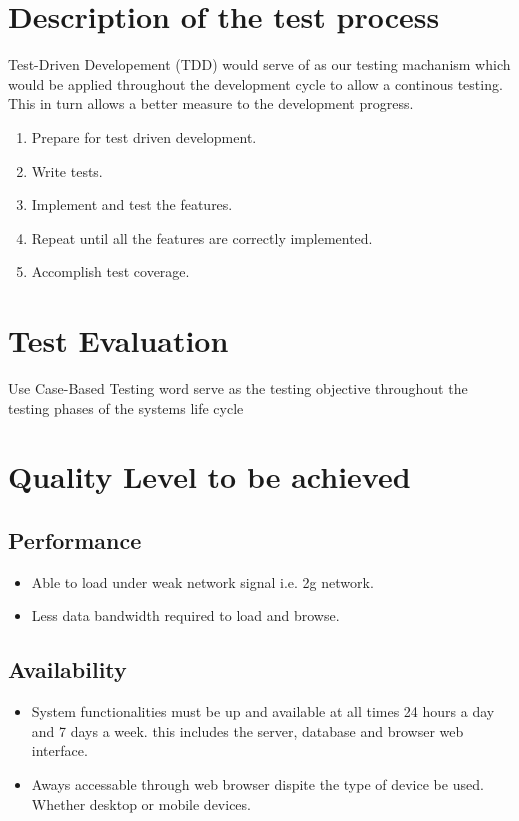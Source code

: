 \documentclass[a4paper,12pt]{article}
\begin{document}
	\section{Description of the test process}
	Test-Driven Developement (TDD) would serve of as our testing machanism which would be applied throughout the development cycle to allow a continous testing. This in turn allows a better measure to the development progress.
	\begin{enumerate}
		\item Prepare for test driven development.
		\item Write tests.
		\item Implement and test the features.
		\item Repeat until all the features are correctly implemented.
		\item Accomplish test coverage. 
	\end{enumerate}
	\section{Test Evaluation}
	Use Case-Based Testing word serve as the testing objective throughout the testing phases of the systems life cycle
	
	\section{Quality Level to be achieved}
	\subsection{Performance}
	\begin{itemize}
		\item Able to load under weak network signal i.e. 2g network.
		\item Less data bandwidth required to load and browse.
	\end{itemize}
	\subsection{Availability}
	\begin{itemize}
		\item System functionalities must be up and available at all times 24 hours a day and 7 days a week. this includes the server, database and browser web interface.
		\item Aways accessable through web browser dispite the type of device be used. Whether desktop or mobile devices.
	\end{itemize}
\end{document}
